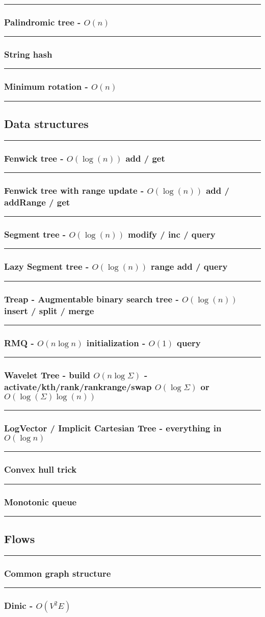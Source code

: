 \documentclass[landscape,a4paper,twocolumn,10pt]{report}
\renewcommand{\line}{\noindent\rule{\linewidth}{1pt}}
\newcommand{\algosection}[1]{\line \subsection*{#1}}
\newcommand{\algorithm}[1]{\line \subsubsection*{#1}}
\begin{document}
\algorithm{Palindromic tree - $O(n)$}


\algorithm{String hash}


\algorithm{Minimum rotation - $O(n)$}


\algosection{Data structures}
\label{datastruct}

%

\algorithm{Fenwick tree - $O(\log(n))$ add / get}


\algorithm{Fenwick tree with range update - $O(\log(n))$ add / addRange / get}


\algorithm{Segment tree - $O(\log(n))$ modify / inc / query}


\algorithm{Lazy Segment tree - $O(\log(n))$ range add / query}


\algorithm{Treap - Augmentable binary search tree - $O(\log(n))$ insert / split / merge}


%

\algorithm{RMQ - $O(n \log n)$ initialization - $O(1)$ query}


\algorithm{Wavelet Tree - build $O(n \log \Sigma)$ - activate/kth/rank/rankrange/swap $O(\log \Sigma)$ or $O(\log(\Sigma) \log(n))$}


\algorithm{LogVector / Implicit Cartesian Tree - everything in $O(\log n)$}


\algorithm{Convex hull trick}


\algorithm{Monotonic queue}


\algosection{Flows}
\label{flows}

\algorithm{Common graph structure}


\algorithm{Dinic - $O(V^2 E)$}

\end{document}
